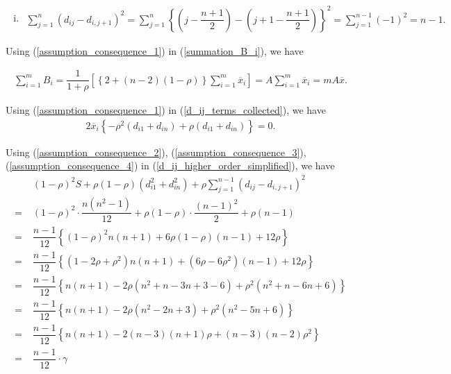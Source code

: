 \documentclass[11pt, a4paper]{article}
\begin{document}
\begin{itemize}
\begin{enumerate}[(i)]
\item \begin{align}\label{assumption_consequence_4}
\sum\limits_{j=1}^{n} \left(d_{ij} - d_{i,j+1}\right)^2
= \sum\limits_{j=1}^{n} \left\{ \left(j - \dfrac{n+1}{2}\right) - \left(j+1 - \dfrac{n+1}{2} \right) \right\}^2 = \sum\limits_{j=1}^{n-1} (-1)^2 = n-1.
\end{align}
\end{enumerate}

Using (\ref{assumption_consequence_1}) in (\ref{summation_B_i}), we have

\begin{align}
\sum \limits_{i = 1}^{m} B_i = \dfrac{1}{1 + \rho} \left[ \left\{ 2 + (n-2) (1 - \rho) \right\} \sum \limits_{i = 1}^{m} \overline{x}_i \right] = A \sum \limits_{i = 1}^{m} \overline{x}_i = mA\overline{x} .
\end{align}

Using (\ref{assumption_consequence_1}) in (\ref{d_ij_terms_collected}), we have 
\begin{align}\label{d_ij_terms_final}
2 \overline{x}_i \left\{- \rho^2 (d_{i1} + d_{in}) + \rho (d_{i1} + d_{in})\right\} = 0.
\end{align}

Using (\ref{assumption_consequence_2}), (\ref{assumption_consequence_3}), (\ref{assumption_consequence_4}) in (\ref{d_ij_higher_order_simplified}), we have
\begin{align}\label{d_ij_higher_order_final}
&(1-\rho)^2S + \rho (1 - \rho) (d_{i1}^2 + d_{in}^2) + \rho \sum\limits_{j=1}^{n-1} \left(d_{ij} - d_{i,j+1}\right)^2 \nonumber \\[0.7em]
=\; &(1-\rho)^2 \cdot \dfrac{n(n^2-1)}{12} + \rho(1-\rho)\cdot \dfrac{(n-1)^2}{2} + \rho (n-1) \nonumber \\[0.7em]
=\; &\dfrac{n-1}{12} \left\{ (1-\rho)^2 n(n+1) + 6\rho(1-\rho)(n-1) + 12\rho \right\} \nonumber \\[0.7em]
=\; &\dfrac{n-1}{12} \left\{ (1 - 2\rho + \rho^2)n(n+1) + (6\rho - 6\rho^2)(n-1)+ 12\rho \right\} \nonumber \\[0.7em]
=\; &\dfrac{n-1}{12} \left\{ n(n+1) - 2\rho(n^2 + n - 3n + 3 - 6) + \rho^2(n^2 + n - 6n + 6)\right\} \nonumber \\[0.7em]
=\; &\dfrac{n-1}{12} \left\{ n(n+1) - 2\rho(n^2 - 2n + 3) + \rho^2(n^2 - 5n + 6)\right\} \nonumber \\[0.7em]
=\; &\dfrac{n-1}{12} \left\{ n(n+1) - 2(n-3)(n+1) \rho + (n-3)(n-2) \rho^2 \right\} \nonumber \\[0.7em]
=\; &\dfrac{n-1}{12} \cdot \gamma
\end{align}


\end{itemize}
\end{document}
